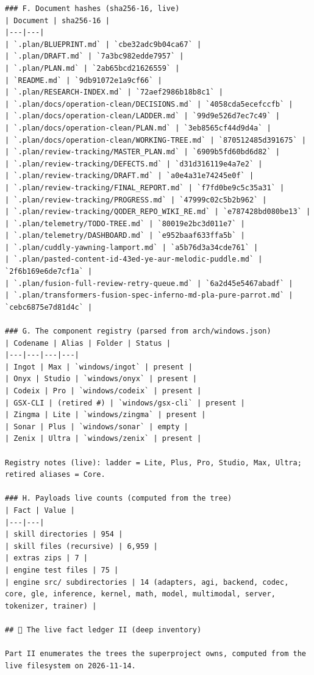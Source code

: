 \begin{Verbatim}[breaklines,breakanywhere,fontsize=\footnotesize]
### F. Document hashes (sha256-16, live)
| Document | sha256-16 |
|---|---|
| `.plan/BLUEPRINT.md` | `cbe32adc9b04ca67` |
| `.plan/DRAFT.md` | `7a3bc982edde7957` |
| `.plan/PLAN.md` | `2ab65bcd21626559` |
| `README.md` | `9db91072e1a9cf66` |
| `.plan/RESEARCH-INDEX.md` | `72aef2986b18b8c1` |
| `.plan/docs/operation-clean/DECISIONS.md` | `4058cda5ecefccfb` |
| `.plan/docs/operation-clean/LADDER.md` | `99d9e526d7ec7c49` |
| `.plan/docs/operation-clean/PLAN.md` | `3eb8565cf44d9d4a` |
| `.plan/docs/operation-clean/WORKING-TREE.md` | `870512485d391675` |
| `.plan/review-tracking/MASTER_PLAN.md` | `6909b5fd60bd6d82` |
| `.plan/review-tracking/DEFECTS.md` | `d31d316119e4a7e2` |
| `.plan/review-tracking/DRAFT.md` | `a0e4a31e74245e0f` |
| `.plan/review-tracking/FINAL_REPORT.md` | `f7fd0be9c5c35a31` |
| `.plan/review-tracking/PROGRESS.md` | `47999c02c5b2b962` |
| `.plan/review-tracking/QODER_REPO_WIKI_RE.md` | `e787428bd080be13` |
| `.plan/telemetry/TODO-TREE.md` | `80019e2bc3d011e7` |
| `.plan/telemetry/DASHBOARD.md` | `e952baaf633ffa5b` |
| `.plan/cuddly-yawning-lamport.md` | `a5b76d3a34cde761` |
| `.plan/pasted-content-id-43ed-ye-aur-melodic-puddle.md` | `2f6b169e6de7cf1a` |
| `.plan/fusion-full-review-retry-queue.md` | `6a2d45e5467abadf` |
| `.plan/transformers-fusion-spec-inferno-md-pla-pure-parrot.md` | `cebc6875e7d81d4c` |

### G. The component registry (parsed from arch/windows.json)
| Codename | Alias | Folder | Status |
|---|---|---|---|
| Ingot | Max | `windows/ingot` | present |
| Onyx | Studio | `windows/onyx` | present |
| Codeix | Pro | `windows/codeix` | present |
| GSX-CLI | (retired #) | `windows/gsx-cli` | present |
| Zingma | Lite | `windows/zingma` | present |
| Sonar | Plus | `windows/sonar` | empty |
| Zenix | Ultra | `windows/zenix` | present |

Registry notes (live): ladder = Lite, Plus, Pro, Studio, Max, Ultra; retired aliases = Core.

### H. Payloads live counts (computed from the tree)
| Fact | Value |
|---|---|
| skill directories | 954 |
| skill files (recursive) | 6,959 |
| extras zips | 7 |
| engine test files | 75 |
| engine src/ subdirectories | 14 (adapters, agi, backend, codec, core, gle, inference, kernel, math, model, multimodal, server, tokenizer, trainer) |

## 📒 The live fact ledger II (deep inventory)

Part II enumerates the trees the superproject owns, computed from the live filesystem on 2026-11-14.


\end{Verbatim}
